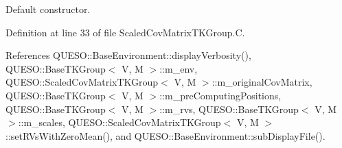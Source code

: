 Default constructor. 



Definition at line 33 of file Scaled\-Cov\-Matrix\-T\-K\-Group.\-C.



References Q\-U\-E\-S\-O\-::\-Base\-Environment\-::display\-Verbosity(), Q\-U\-E\-S\-O\-::\-Base\-T\-K\-Group$<$ V, M $>$\-::m\-\_\-env, Q\-U\-E\-S\-O\-::\-Scaled\-Cov\-Matrix\-T\-K\-Group$<$ V, M $>$\-::m\-\_\-original\-Cov\-Matrix, Q\-U\-E\-S\-O\-::\-Base\-T\-K\-Group$<$ V, M $>$\-::m\-\_\-pre\-Computing\-Positions, Q\-U\-E\-S\-O\-::\-Base\-T\-K\-Group$<$ V, M $>$\-::m\-\_\-rvs, Q\-U\-E\-S\-O\-::\-Base\-T\-K\-Group$<$ V, M $>$\-::m\-\_\-scales, Q\-U\-E\-S\-O\-::\-Scaled\-Cov\-Matrix\-T\-K\-Group$<$ V, M $>$\-::set\-R\-Vs\-With\-Zero\-Mean(), and Q\-U\-E\-S\-O\-::\-Base\-Environment\-::sub\-Display\-File().


